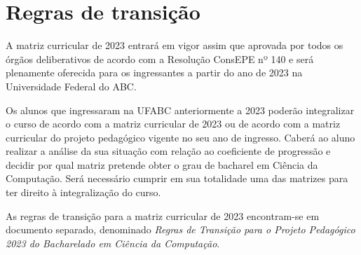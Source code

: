 \section{Regras de transição}
\label{sec:regras_transicao}

A matriz curricular de 2023 entrará em vigor assim que aprovada por todos os
órgãos deliberativos de acordo com a Resolução ConsEPE nº 140 e será plenamente
oferecida para os ingressantes a partir do ano de 2023 na Universidade Federal
do ABC.

Os alunos que ingressaram na UFABC anteriormente a 2023 poderão integralizar o
curso de acordo com a matriz curricular de 2023 ou de acordo com a matriz
curricular do projeto pedagógico vigente no seu ano de ingresso.
Caberá ao aluno realizar a análise da sua situação com relação ao coeficiente
de progressão e decidir por qual matriz pretende obter o grau de bacharel em
Ciência da Computação.
Será necessário cumprir em sua totalidade uma das matrizes para ter direito à
integralização do curso.

As regras de transição para a matriz curricular de 2023 encontram-se em
documento separado, denominado \emph{Regras de Transição para o Projeto
Pedagógico 2023 do Bacharelado em Ciência da Computação}.



